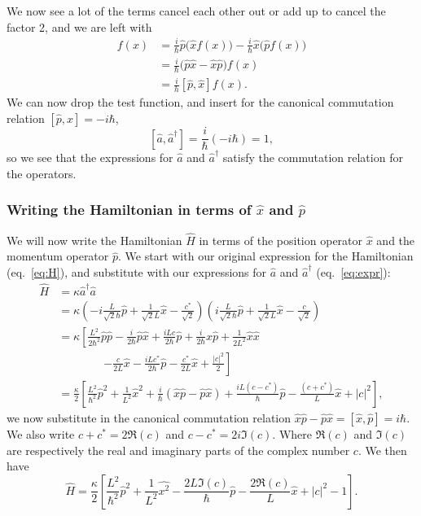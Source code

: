 \documentclass[a4paper, 11pt, titlepage, english]{article}
\newcommand{\op}[1]{\hat{#1}}
\begin{document}
We now see a lot of the terms cancel each other out or add up to cancel the factor 2, and we are left with
\begin{align*}
[\op{a}, \op{a}^\dag]f(x) &= \frac{i}{\hbar}\op{p}\bigg(\op{x}f(x)\bigg) - \frac{i}{\hbar}\op{x}\bigg(\op{p}f(x)\bigg) \\
&= \frac{i}{\hbar}\Bigg(\op{p}\op{x} - \op{x}\op{p}\Bigg)f(x) \\
&= \frac{i}{h}\left[\op{p}, \op{x}\right]f(x).
\end{align*}
We can now drop the test function, and insert for the canonical commutation relation $[\op{p}, \op{x}] = -i\hbar$,
$$ [\op{a}, \op{a}^\dag] = \frac{i}{\hbar}(-i\hbar) = 1,$$
so we see that the expressions for $\op{a}$ and $\op{a}^\dag$ satisfy the commutation relation for the operators.

\clearpage
\subsubsection*{Writing the Hamiltonian in terms of $\op{x}$ and $\op{p}$}
We will now write the Hamiltonian $\op{H}$ in terms of the position operator $\op{x}$ and the momentum operator $\op{p}$. We start with our original expression for the Hamiltonian (eq.\ \ref{eq:H}), and substitute with our expressions for $\op{a}$ and $\op{a}^\dag$ (eq.\ \ref{eq:expr}):
\begin{align*}
\op{H} &= \kappa\op{a}^\dag\op{a} \\[0.4cm]
&= \kappa\left(-i\frac{L}{\sqrt{2}\hbar}\op{p} + \frac{1}{\sqrt{2}L}\op{x} - \frac{c^*}{\sqrt{2}}\right)\left(i\frac{L}{\sqrt{2}\hbar}\op{p} + \frac{1}{\sqrt{2}L}\op{x} - \frac{c}{\sqrt{2}}\right) \\[0.4cm]
&= \kappa\left[\frac{L^2}{2\hbar^2}\op{p}\op{p} - \frac{i}{2\hbar}\op{p}\op{x} + \frac{iLc}{2\hbar}\op{p}  + \frac{i}{2\hbar}\op{x}\op{p}  + \frac{1}{2L^2}\op{x}\op{x} \right. \\ &\qquad\qquad \left.- \frac{c}{2L}\op{x} - \frac{iLc^*}{2\hbar}\op{p} - \frac{c^*}{2L}\op{x} + \frac{|c|^2}{2} \right] \\[0.4cm]
&= \frac{\kappa}{2}\left[\frac{L^2}{\hbar^2}\op{p}^2  + \frac{1}{L^2}\op{x}^2 + \frac{i}{\hbar}\left(\op{x}\op{p} - \op{p}\op{x}\right) + \frac{iL(c-c^*)}{\hbar}\op{p} - \frac{(c+c^*)}{L}\op{x} + |c|^2 \right],
\end{align*}
we now substitute in the canonical commutation relation $\op{x}\op{p} - \op{p}\op{x} = [\op{x}, \op{p}] = i\hbar$. We also write $c+c^* = 2\Re(c)$ and $c-c^* = 2i\Im(c)$. Where $\Re(c)$ and $\Im(c)$ are respectively the real and imaginary parts of the complex number $c$. We then have
\begin{equation}
\op{H} = \frac{\kappa}{2}\left[\frac{L^2}{\hbar^2}\op{p}^2 + \frac{1}{L^2}\op{x^2} - \frac{2L\Im(c)}{\hbar}\op{p} - \frac{2\Re(c)}{L}\op{x} + |c|^2 -1 \right].
\end{equation}
\end{document}
